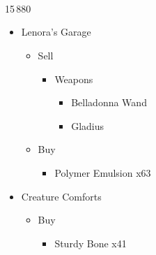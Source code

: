 \chapter[Chapter 6]{}

\begin{paracol}{2}
\switchcolumn
{}
\switchcolumn*
\ 
\begin{shop}{15\,880}
	
		\begin{itemize}
			\item Lenora's Garage
			      \begin{itemize}
				      \item Sell
				            \begin{itemize}
					            \item Weapons
					                  \begin{itemize}
						                  \item Belladonna Wand
						                  \item Gladius
					                  \end{itemize}
				            \end{itemize}
				      \item Buy
				            \begin{itemize}
					            \item Polymer Emulsion x63
				            \end{itemize}
			      \end{itemize}
			      
			\item Creature Comforts
			      \begin{itemize}
				      \item Buy
				            \begin{itemize}
					            \item Sturdy Bone x41
				            \end{itemize}
			      \end{itemize}
		\end{itemize}
\end{shop}


\end{paracol}
